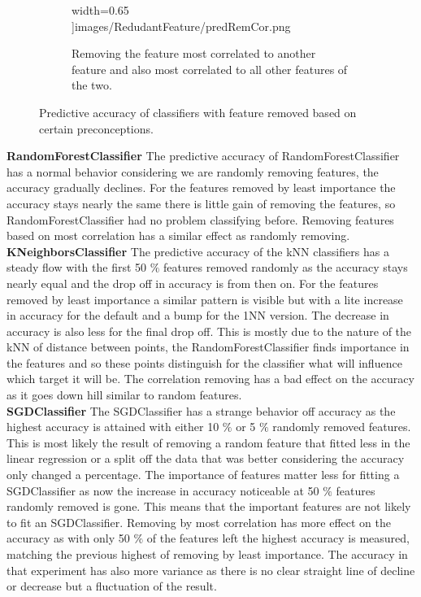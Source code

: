 \documentclass[a4paper,10pt]{article}
\begin{document}
\begin{figure}[H]
\begin{subfigure}[b]{0.65\textwidth}
		width=0.65\textwidth
		]{images/RedudantFeature/predRemCor.png}
		\caption{Removing the feature most correlated to another feature and also most correlated to all other features of the two.}
		\label{fig:predRemCor}
	\end{subfigure}
	
	\caption{Predictive accuracy of classifiers with feature removed based on certain preconceptions.}
	\label{fig:Rem}
\end{figure}

\textbf{RandomForestClassifier} The predictive accuracy of RandomForestClassifier has a normal behavior considering we are randomly removing features, the accuracy gradually declines. For the features removed by least importance the accuracy stays nearly the same there is little gain of removing the features, so RandomForestClassifier had no problem classifying before. Removing features based on most correlation has a similar effect as randomly removing. \\

\textbf{KNeighborsClassifier}  The predictive accuracy of the kNN classifiers has a steady flow with the first 50 $\%$ features removed randomly as the accuracy stays nearly equal and the drop off in accuracy is from then on. For the features removed by least importance a similar pattern is visible but with a lite increase in accuracy for the default and a bump for the 1NN version. The decrease in accuracy is also less for the final drop off. This is mostly due to the nature of the kNN of distance between points, the RandomForestClassifier finds importance in the features and so these points distinguish for the classifier what will influence which target it will be. The correlation removing has a bad effect on the accuracy as it goes down hill similar to random features.  \\

\textbf{SGDClassifier} The SGDClassifier has a strange behavior off accuracy as the highest accuracy is attained with either 10 $\%$ or 5 $\%$ randomly removed features. This is most likely the result of removing a random feature that fitted less in the linear regression or a split off the data that was better considering the accuracy only changed a percentage. The importance of features matter less for fitting a SGDClassifier as now the increase in accuracy noticeable at 50 $\%$ features randomly removed is gone. This means that the important features are not likely to fit an SGDClassifier. Removing by most correlation has more effect on the accuracy as with only 50 $\%$ of the features left the highest accuracy is measured, matching the previous highest of removing by least importance. The accuracy in that experiment has also more variance as there is no clear straight line of decline or decrease but a fluctuation of the result.   \\
\end{document}
